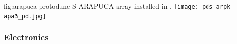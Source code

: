 
\begin{dunefigure}{fig:arapuca-protodune}
{S-ARAPUCA array installed in .} 
\texttt{[image: pds-arpk-apa3\_pd.jpg]} 
\end{dunefigure}


\subsubsection{ Electronics}
\label{sec:ssp-protodune-electronics}





